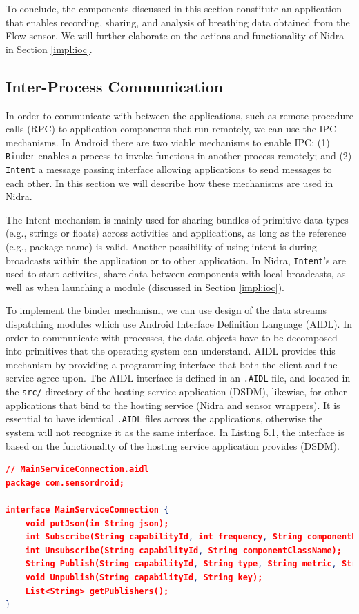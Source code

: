 To conclude, the components discussed in this section constitute an application that enables recording, sharing, and analysis of breathing data obtained from the Flow sensor. We will further elaborate on the actions and functionality of Nidra in Section \ref{impl:ioc}.  


\subsection{Inter-Process Communication}\label{implement:aidl}
In order to communicate with between the applications, such as remote procedure calls (RPC) to application components that run remotely, we can use the IPC mechanisms. In Android there are two viable mechanisms to enable IPC: (1) \verb|Binder| enables a process to invoke functions in another process remotely; and (2) \verb|Intent| a message passing interface allowing applications to send messages to each other. In this section we will describe how these mechanisms are used in Nidra.

The Intent mechanism is mainly used for sharing bundles of primitive data types (e.g., strings or floats) across activities and applications, as long as the reference (e.g., package name) is valid. Another possibility of using intent is during broadcasts within the application or to other application. In Nidra, \verb|Intent|'s are used to start activites, share data between components with local broadcasts, as well as when launching a module (discussed in Section \ref{impl:ioc}).

To implement the binder mechanism, we can use design of the data streams dispatching modules which use Android Interface Definition Language (AIDL). In order to communicate with processes, the data objects have to be decomposed into primitives that the operating system can understand. AIDL provides this mechanism by providing a programming interface that both the client and the service agree upon. The AIDL interface is defined in an \verb|.AIDL| file, and located in the \verb|src/| directory of the hosting service application (DSDM), likewise, for other applications that bind to the hosting service (Nidra and sensor wrappers). It is essential to have identical \verb|.AIDL| files across the applications, otherwise the system will not recognize it as the same interface. In Listing 5.1, the interface is based on the functionality of the hosting service application provides (DSDM). 

\begin{lstlisting}[language=json, caption={An interface provided by the host service (i.e., DSDM) that provides functionality other applications can use (e.g., Nidra and sensor wrappers)}, captionpos=b]
// MainServiceConnection.aidl
package com.sensordroid;

interface MainServiceConnection {
    void putJson(in String json);
    int Subscribe(String capabilityId, int frequency, String componentPackageName, String componentClassName);
    int Unsubscribe(String capabilityId, String componentClassName);
    String Publish(String capabilityId, String type, String metric, String description);
    void Unpublish(String capabilityId, String key);
    List<String> getPublishers();
}
\end{lstlisting}


